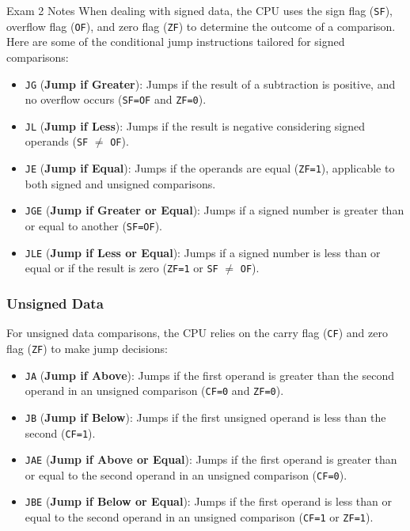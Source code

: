 \begin{examnotes}{Exam 2 Notes}
    When dealing with signed data, the CPU uses the sign flag (\texttt{SF}), overflow flag (\texttt{OF}), and zero flag (\texttt{ZF}) to determine the outcome of a comparison. Here are some of the 
    conditional jump instructions tailored for signed comparisons:

    \begin{itemize}
        \item \texttt{JG} (\textbf{Jump if Greater}): Jumps if the result of a subtraction is positive, and no overflow occurs (\texttt{SF=OF} and \texttt{ZF=0}).
        \item \texttt{JL} (\textbf{Jump if Less}): Jumps if the result is negative considering signed operands (\texttt{SF} $\neq$ \texttt{OF}).
        \item \texttt{JE} (\textbf{Jump if Equal}): Jumps if the operands are equal (\texttt{ZF=1}), applicable to both signed and unsigned comparisons.
        \item \texttt{JGE} (\textbf{Jump if Greater or Equal}): Jumps if a signed number is greater than or equal to another (\texttt{SF=OF}).
        \item \texttt{JLE} (\textbf{Jump if Less or Equal}): Jumps if a signed number is less than or equal or if the result is zero (\texttt{ZF=1} or \texttt{SF} $\neq$ \texttt{OF}).
    \end{itemize}

    \subsubsection*{Unsigned Data}

    For unsigned data comparisons, the CPU relies on the carry flag (\texttt{CF}) and zero flag (\texttt{ZF}) to make jump decisions:

    \begin{itemize}
        \item \texttt{JA} (\textbf{Jump if Above}): Jumps if the first operand is greater than the second operand in an unsigned comparison (\texttt{CF=0} and \texttt{ZF=0}).
        \item \texttt{JB} (\textbf{Jump if Below}): Jumps if the first unsigned operand is less than the second (\texttt{CF=1}).
        \item \texttt{JAE} (\textbf{Jump if Above or Equal}): Jumps if the first operand is greater than or equal to the second operand in an unsigned comparison (\texttt{CF=0}).
        \item \texttt{JBE} (\textbf{Jump if Below or Equal}): Jumps if the first operand is less than or equal to the second operand in an unsigned comparison (\texttt{CF=1} or \texttt{ZF=1}).
    \end{itemize}


\end{examnotes}
